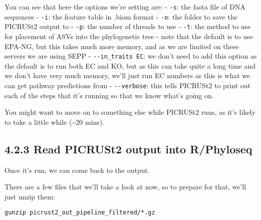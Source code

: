 \documentclass[
]{book}
\begin{document}
You can see that here the options we're setting are:
- \texttt{-s}: the fasta file of DNA sequences
- \texttt{-i}: the feature table in .biom format
- \texttt{-o}: the folder to save the PICRUSt2 output to
- \texttt{-p}: the number of threads to use
- \texttt{-t}: the method to use for placement of ASVs into the phylogenetic tree - note that the default is to use EPA-NG, but this takes much more memory, and as we are limited on these servers we are using SEPP
- \texttt{-\/-in\_traits\ EC}: we don't need to add this option as the default is to run both EC and KO, but as this can take quite a long time and we don't have very much memory, we'll just run EC numbers as this is what we can get pathway predictions from
- \texttt{-\/-verbose}: this tells PICRUSt2 to print out each of the steps that it's running so that we know what's going on.

You might want to move on to something else while PICRUSt2 runs, as it's likely to take a little while (\textasciitilde20 mins).

\subsection{4.2.3 Read PICRUSt2 output into R/Phyloseq}\label{read-picrust2-output-into-rphyloseq}

Once it's run, we can come back to the output.

There are a few files that we'll take a look at now, so to prepare for that, we'll just unzip them:

\begin{verbatim}
gunzip picrust2_out_pipeline_filtered/*.gz
\end{verbatim}
\end{document}
